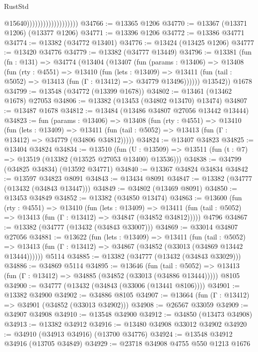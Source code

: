 \begin{lexlean}{RustStd}
\begin{coremodule}
                                          @15640)))))))))))))))))))
@34766 := @13365 @1206
@34770 := @13367 (@13371 @1206) (@13377 @1206)
@34771 := @13396 @1206
@34772 := @13386 @34771
@34774 := @13382 (@34772 @13401)
@34776 := @13424 (@13425 @1206)
@34777 := @13420 @34776
@34779 := @13382 (@34777 @13449)
@34796 := @13381
    (fun (fn : @131) =>
    @34774
      (@13404
        (@13407
          (fun (params : @13406) =>
          @13408
            (fun (rty : @4551) =>
            @13410
              (fun (lets : @13409) =>
              @13411 (fun (tail : @5052) => @13413 (fun (Γ : @13412) => @34779 @13496))))))
        @13542))
    @1678
@34799 := @13548 (@34772 (@13399 @1678))
@34802 := @13461 (@13462 @1678) @27053
@34806 := @13382 (@13453 (@34802 @13470) @13474)
@34807 := @13487 @1678
@34812 := @13484 (@13486 @34807 @27056 @13442 @13444)
@34823 := fun (params : @13406) =>
  @13408
    (fun (rty : @4551) =>
    @13410
      (fun (lets : @13409) =>
      @13411 (fun (tail : @5052) => @13413 (fun (Γ : @13412) => @34779 (@34806 @34812)))))
@34824 := @13407 @34823
@34825 := @13404 @34824
@34834 := @13510
    (fun (U : @13509) => @13511 (fun (t : @7) => @13519 (@13382 (@13525 @27053 @13400) @13536)))
@34838 := @34799 (@34825 @34834) (@13592 @34771)
@34840 := @13367 @34824 @34834
@34842 := @13597 @34823 @8091
@34843 := @13434 @8091
@34847 := @13382 (@34777 (@13432 (@34843 @13447)))
@34849 := @34802 (@13469 @8091)
@34850 := @13453 @34849
@34852 := @13382 (@34850 @13474)
@34863 := @13600
    (fun (rty : @4551) =>
    @13410
      (fun (lets : @13409) =>
      @13411 (fun (tail : @5052) => @13413 (fun (Γ : @13412) => @34847 (@34852 @34812)))))
    @4796
@34867 := @13382 (@34777 (@13432 (@34843 @33007)))
@34869 := @33014 @34807 @27056
@34881 := @13622
    (fun (lets : @13409) =>
    @13411
      (fun (tail : @5052) =>
      @13413 (fun (Γ : @13412) => @34867 (@34852 (@33013 (@34869 @13442 @13444))))))
    @5114
@34885 := @13382 (@34777 (@13432 (@34843 @33029)))
@34886 := @34869 @5114
@34895 := @13646
    (fun (tail : @5052) => @13413 (fun (Γ : @13412) => @34885 (@34852 (@33013 (@34886 @13444)))))
    @8105
@34900 := @34777 (@13432 (@34843 (@33006 (@13441 @8106))))
@34901 := @13382 @34900
@34902 := @34886 @8105
@34907 := @13664 (fun (Γ : @13412) => @34901 (@34852 (@33013 @34902)))
@34908 := @26567 @33059
@34909 := @34907 @34908
@34910 := @13548 @34900
@34912 := @34850 (@13473 @34908)
@34913 := @13382 @34912
@34916 := @13480 @34908 @33012 @34902
@34920 := @34910 (@34913 @34916) (@13700 @34776)
@34924 := @13548 @34912 @34916 (@13705 @34849)
@34929 := @23718 @34908 @4755 @550 @1213 @1676

\end{coremodule}
\end{lexlean}
